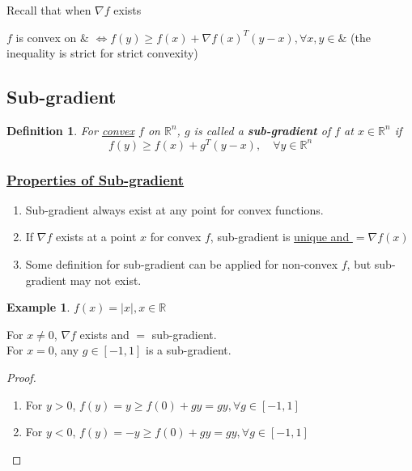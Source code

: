 \documentclass[11pt,a4paper]{article}
\newtheorem{definition}{Definition}
\newtheorem{example}{Example}
\begin{document}
Recall that when $\nabla f$ exists

$f$ is convex on $\&$ $\Leftrightarrow f(y)\geq f(x)+\nabla f(x)^T(y-x),\forall x,y\in\&$ (the inequality is strict for strict convexity)
\subsection{Sub-gradient}
\begin{definition}
    For \underline{convex} $f$ on $\mathbb{R}^n$, $g$ is called a \textbf{sub-gradient} of $f$ at $x\in \mathbb{R}^n$ if $$f(y)\geq f(x)+g^T(y-x),\quad \forall y\in \mathbb{R}^n$$
\end{definition}
\subsubsection*{\underline{Properties of Sub-gradient}}
\begin{enumerate}[1)]
    \item Sub-gradient always exist at any point for convex functions.
    \item If $\nabla f$ exists at a point $x$ for convex $f$, sub-gradient is \underline{unique and $=\nabla f(x)$}
    \item Some definition for sub-gradient can be applied for non-convex $f$, but sub-gradient may not exist.
\end{enumerate}

\begin{example}
$f(x)=|x|,x\in \mathbb{R}$
\end{example}
For $x\neq 0$, $\nabla f$ exists and $=$ sub-gradient.\\
For $x=0$, any $g\in[-1,1]$ is a sub-gradient.
\begin{proof}\quad
\begin{enumerate}[(1)]
    \item For $y>0$, $f(y)=y\geq f(0)+gy=gy,\forall g\in[-1,1]$
    \item For $y<0$, $f(y)=-y\geq f(0)+gy=gy,\forall g\in[-1,1]$
\end{enumerate}
\end{proof}
\end{document}
